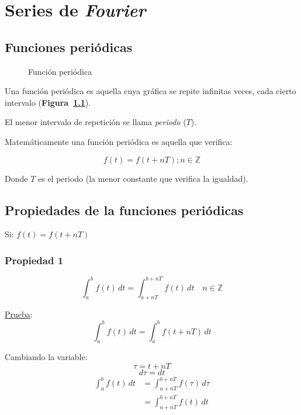 \chapter{Series de \emph{Fourier}}

\section{Funciones periódicas}

\begin{figure}[H]
    \centering
    
    \caption{Función periódica}\label{figura_01}
\end{figure}

Una función periódica es aquella cuya gráfica se repite infinitas veces, cada
cierto intervalo (\textbf{Figura~\ref{figura_01}}).

El menor intervalo de repetición se llama \emph{periodo} ($T$).

Matemáticamente una función periódica es aquella que verifica:

\begin{equation}
    f(t)=f(t+nT);n\in\mathbb{Z}
\label{funcion_periodica}
\end{equation}

Donde $T$ es el periodo (la menor constante que verifica la igualdad).

\section{Propiedades de la funciones periódicas}

Si: $f(t)=f(t+nT)$

\subsection*{Propiedad 1}
\begin{equation}
    \int_a^b f(t)\,dt=\int_{a+nT}^{b+nT}f(t)\,dt\quad n\in\mathbb{Z}
\label{propiedad1}
\end{equation}

\underline{Prueba}:
\begin{equation*}
    \int_a^b f(t)\,dt=\int_{a}^{b} f(t+nT)\,dt
\end{equation*}

Cambiando la variable:
\begin{equation*}
    \tau=t+nT
\end{equation*}
\begin{equation*}
    d\tau=dt
\end{equation*}
\begin{equation*}
\begin{split}
    \int_a^b f(t)\,dt
        &=\int_{a+nT}^{b+nT} f(\tau)\,d\tau\\
        &=\int_{a+nT}^{b+nT} f(t)\,dt
\end{split}
\end{equation*}

